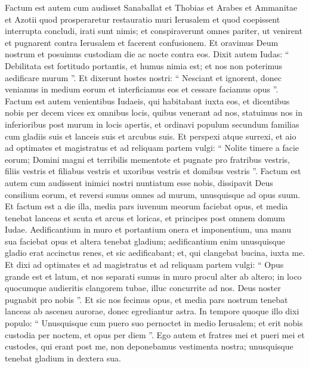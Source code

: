 \begin{biblechapter}
\begin{biblechapter}
\begin{biblechapter}
\begin{biblechapter}
\verse Factum est autem cum audisset Sanaballat et Thobias et Arabes et Ammanitae et Azotii quod prosperaretur restauratio muri Ierusalem et quod coepissent interrupta concludi, irati sunt nimis; 
\verse et conspiraverunt omnes pariter, ut venirent et pugnarent contra Ierusalem et facerent confusionem. 
 \verse Et oravimus Deum nostrum et posuimus custodiam die ac nocte contra eos. 
\verse Dixit autem Iudas: “ Debilitata est fortitudo portantis, et humus nimia est; et nos non poterimus aedificare murum ”. 
\verse Et dixerunt hostes nostri: “ Nesciant et ignorent, donec veniamus in medium eorum et interficiamus eos et cessare faciamus opus ”.
 \verse Factum est autem venientibus Iudaeis, qui habitabant iuxta eos, et dicentibus nobis per decem vices ex omnibus locis, quibus venerant ad nos, 
\verse statuimus nos in inferioribus post murum in locis apertis, et ordinavi populum secundum familias cum gladiis suis et lanceis suis et arcubus suis. 
\verse Et perspexi atque surrexi, et aio ad optimates et magistratus et ad reliquam partem vulgi: “ Nolite timere a facie eorum; Domini magni et terribilis mementote et pugnate pro fratribus vestris, filiis vestris et filiabus vestris et uxoribus vestris et domibus vestris ”. 
\verse Factum est autem cum audissent inimici nostri nuntiatum esse nobis, dissipavit Deus consilium eorum, et reversi sumus omnes ad murum, unusquisque ad opus suum. 
\verse Et factum est a die illa, media pars iuvenum meorum faciebat opus, et media tenebat lanceas et scuta et arcus et loricas, et principes post omnem domum Iudae. 
\verse Aedificantium in muro et portantium onera et imponentium, una manu sua faciebat opus et altera tenebat gladium; 
 \verse aedificantium enim unusquisque gladio erat accinctus renes, et sic aedificabant; et, qui clangebat bucina, iuxta me. 
\verse Et dixi ad optimates et ad magistratus et ad reliquam partem vulgi: “ Opus grande est et latum, et nos separati sumus in muro procul alter ab altero; 
\verse in loco quocumque audieritis clangorem tubae, illuc concurrite ad nos. Deus noster pugnabit pro nobis ”. 
\verse Et sic nos fecimus opus, et media pars nostrum tenebat lanceas ab ascensu aurorae, donec egrediantur astra.
 \verse In tempore quoque illo dixi populo: “ Unusquisque cum puero suo pernoctet in medio Ierusalem; et erit nobis custodia per noctem, et opus per diem ”. 
\verse Ego autem et fratres mei et pueri mei et custodes, qui erant post me, non deponebamus vestimenta nostra; unusquisque tenebat gladium in dextera sua.
 

\end{biblechapter}
\end{biblechapter}
\end{biblechapter}
\end{biblechapter}
